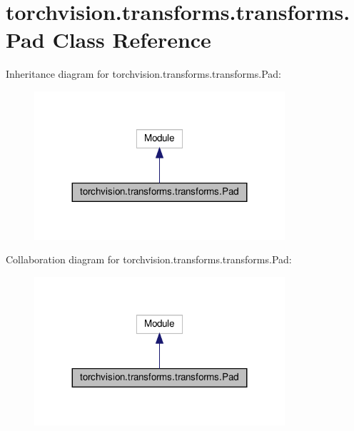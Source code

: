 \hypertarget{classtorchvision_1_1transforms_1_1transforms_1_1Pad}{}\section{torchvision.\+transforms.\+transforms.\+Pad Class Reference}
\label{classtorchvision_1_1transforms_1_1transforms_1_1Pad}


Inheritance diagram for torchvision.\+transforms.\+transforms.\+Pad\+:
\nopagebreak
\begin{figure}[H]
\begin{center}
\leavevmode
\includegraphics[width=263pt]{classtorchvision_1_1transforms_1_1transforms_1_1Pad__inherit__graph}
\end{center}
\end{figure}


Collaboration diagram for torchvision.\+transforms.\+transforms.\+Pad\+:
\nopagebreak
\begin{figure}[H]
\begin{center}
\leavevmode
\includegraphics[width=263pt]{classtorchvision_1_1transforms_1_1transforms_1_1Pad__coll__graph}
\end{center}
\end{figure}
